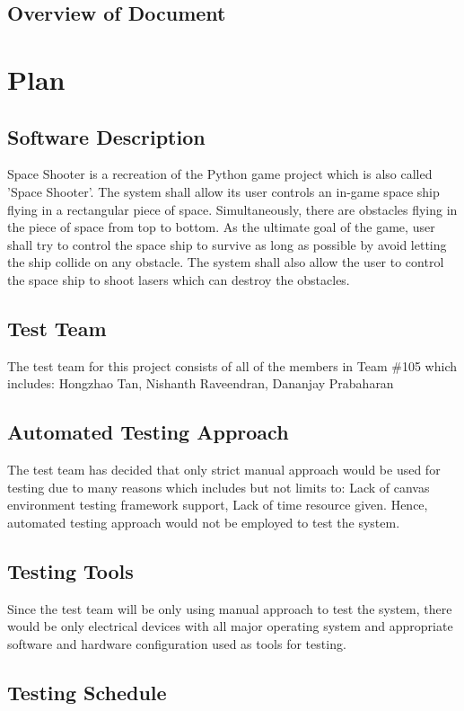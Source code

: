\documentclass[12pt, titlepage]{article}
\begin{document}
\subsection{Overview of Document}

\section{Plan}
	
\subsection{Software Description}
Space Shooter is a recreation of the Python game project which is also called 'Space Shooter'. The system shall allow its user controls an in-game space ship flying in a rectangular piece of space. Simultaneously, there are obstacles flying in the piece of space from top to bottom. As the ultimate goal of the game, user shall try to control the space ship to survive as long as possible by avoid letting the ship collide on any obstacle. The system shall also allow the user to control the space ship to shoot lasers which can destroy the obstacles.  
\subsection{Test Team}
The test team for this project consists of all of the members in Team \#105 which includes: Hongzhao Tan, Nishanth Raveendran, Dananjay Prabaharan
\subsection{Automated Testing Approach}
The test team has decided that only strict manual approach would be used for testing due to many reasons which includes but not limits to: Lack of canvas environment testing framework support, Lack of time resource given. Hence, automated testing approach would not be employed to test the system. 
\subsection{Testing Tools}
Since the test team will be only using manual approach to test the system, there would be only electrical devices with all major operating system and appropriate software and hardware configuration used as tools for testing.
\subsection{Testing Schedule}
		
\end{document}
